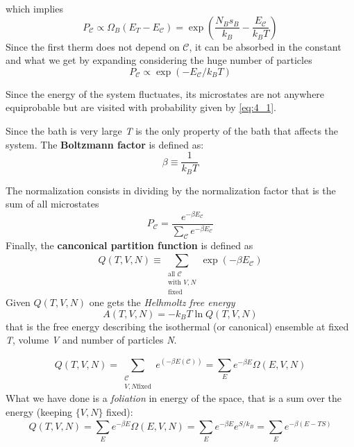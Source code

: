 \documentclass[../main/main.tex]{subfiles}
\begin{document}
which implies
\begin{equation}
  P_{\mathcal{C}} \propto \Omega _B (E_T - E_{\mathcal{C}}) = \exp (\frac{N_B s_B}{k_B}- \frac{E_{\mathcal{C}}}{k_B T})
\end{equation}
Since the first therm does not depend on \( \mathcal{C} \), it can be absorbed in the constant and what we get by expanding considering the huge number of particles
\begin{equation}
  P_{\mathcal{C}} \propto \exp (-E_{\mathcal{C}}/k_B T)
  \label{eq:4_1}
\end{equation}
\begin{observation}
Since the energy of the system fluctuates, its microstates are not anywhere equiprobable but are visited with probability given by \eqref{eq:4_1}.
\end{observation}
\begin{remark}
Since the bath is very large \emph{T} is the only property of the bath that affects the system. The \textbf{Boltzmann factor} is defined as:
\begin{equation}
  \beta \equiv \frac{1}{k_B T}
\end{equation}
\end{remark}
The normalization consists in dividing by the normalization factor that is the sum of all microstates
\begin{equation}
  P_{\mathcal{C}} = \frac{e^{-\beta E_ \mathcal{C}}}{\sum_{\mathcal{C}}^{} e^{-\beta E_ \mathcal{C}} }
\end{equation}
Finally, the \textbf{canconical partition function} is defined as
\begin{equation}
  Q(T,V,N) \equiv \sum_{\substack{ \text{all } \mathcal{C} \\  \text{with } V,N \\ \text{fixed}} }^{}  \exp (-\beta E_{\mathcal{C}})
\end{equation}
Given \( Q(T,V,N) \) one gets the \emph{Helhmoltz free energy}
\begin{equation}
  A(T,V,N) = - k_B T \ln{Q(T,V,N)}
\end{equation}
that is the free energy describing the isothermal (or canonical) ensemble at fixed \emph{T}, volume \emph{V} and number of particles \emph{N}.
\begin{remark}
\begin{equation}
  Q(T,V,N) = \sum_{\substack{ \mathcal{C} \\ V,N \text{fixed} }} e^{(-\beta E (\mathcal{C}))} = \sum_{E}^{} e^{-\beta E} \Omega (E,V,N)
\end{equation}
What we have done is a \emph{foliation} in energy of the space, that is a sum over the energy (keeping \( \{V,N\} \) fixed):
\begin{equation}
  Q(T,V,N) = \sum_{E}^{} e^{-\beta E} \Omega (E,V,N) = \sum_{E}^{} e^{-\beta E} e^{S/k_B} = \sum_{E}^{} e^{-\beta (E-T S)}
  \label{eq:}
\end{equation}
\end{remark}
\end{document}
